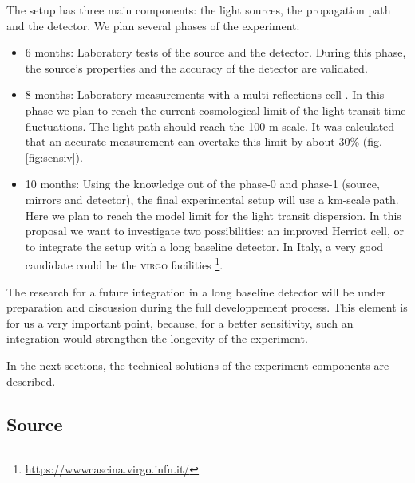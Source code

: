 \documentclass[9pt, a4, twoside]{article}
\begin{document}
The setup has three main components: the light sources, the propagation path and the detector. We plan several phases of the experiment:
\begin{itemize}
\item[Phase-0)] 6 months: Laboratory tests of the source and the detector. During this phase, the source's properties and the accuracy of the detector are validated.
\item[Phase-1)] 8 months: Laboratory measurements with a multi-reflections cell \cite{herriottcell}. In this phase we plan to reach the current cosmological limit of the light transit time fluctuations. The light path should reach the 100 m scale. It was calculated that an accurate measurement can overtake this limit by about 30\% (fig. \ref{fig:sensiv}).
\item[Phase-2)] 10 months: Using the knowledge out of the phase-0 and phase-1 (source, mirrors and detector), the final experimental setup will use a km-scale path. Here we plan to reach the model limit for the light transit dispersion. In this proposal we want to investigate two possibilities: an improved Herriot cell, or to integrate the setup with a long baseline detector. In Italy, a very good candidate could be the \textsc{virgo} facilities \footnote{\url{https://wwwcascina.virgo.infn.it/}}.
\end{itemize}
The research for a future integration in a long baseline detector will be under preparation and discussion during the full developpement process. This element is for us a very important point, because, for a better sensitivity, such an integration would strengthen the longevity of the experiment.

In the next sections, the technical solutions of the experiment components are described.

\subsection{Source}
\end{document}
